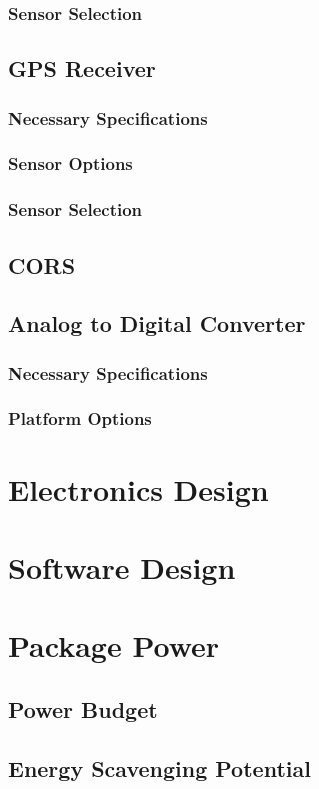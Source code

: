 \documentclass[12pt]{report}
\begin{document}
			\subsubsection{Sensor Selection}
		\subsection{GPS Receiver}			
			\subsubsection{Necessary Specifications}
			\subsubsection{Sensor Options}
			\subsubsection{Sensor Selection}
		\subsection{CORS}
		\subsection{Analog to Digital Converter}
			\subsubsection{Necessary Specifications}					
			\subsubsection{Platform Options}
	\section{Electronics Design}
			
			
	\section{Software Design}
	\section{Package Power}
		\subsection{Power Budget}
		\subsection{Energy Scavenging Potential}
\end{document}
